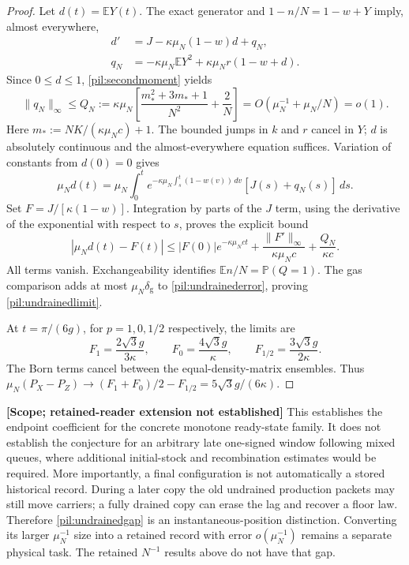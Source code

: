\documentclass[11pt,a4paper]{article}
\theoremstyle{definition}
\theoremstyle{remark}\newtheorem{remark}[theorem]{Remark}
\newcommand{\status}[1]{\textbf{[#1]}\quad}
\begin{document}
\begin{proof}
Let $d(t)=\mathbb E Y(t)$. The exact generator and $1-n/N=1-w+Y$ imply, almost everywhere,
\begin{align}\label{pil:deficitODE}
 d'&=J-\kappa\mu_N(1-w)d+q_N,\\
 q_N&=-\kappa\mu_N\mathbb E Y^2
       +\kappa\mu_N r(1-w+d).\nonumber
\end{align}
Since $0\le d\le1$, \eqref{pil:secondmoment} yields
\[
 \|q_N\|_\infty\le Q_N:=\kappa\mu_N\left[
 \frac{m_*^2+3m_*+1}{N^2}+\frac2N\right]
 =O(\mu_N^{-1}+\mu_N/N)=o(1).
\]
Here $m_*:=NK/(\kappa\mu_Nc)+1$.
The bounded jumps in $k$ and $r$ cancel in $Y$; $d$ is absolutely continuous and the almost-everywhere equation suffices. Variation of constants from $d(0)=0$ gives
\[
 \mu_Nd(t)=\mu_N\int_0^t
 e^{-\kappa\mu_N\int_s^t(1-w(v))\,dv}[J(s)+q_N(s)]\,ds.
\]
Set $F=J/[\kappa(1-w)]$. Integration by parts of the $J$ term, using the derivative of the exponential with respect to $s$, proves the explicit bound
\begin{equation}\label{pil:undrainederror}
 |\mu_Nd(t)-F(t)|\le
 |F(0)|e^{-\kappa\mu_Nct}
 +\frac{\|F'\|_\infty}{\kappa\mu_Nc}
 +\frac{Q_N}{\kappa c}.
\end{equation}
All terms vanish. Exchangeability identifies $\mathbb E n/N=\mathbb P(Q=1)$. The gas comparison adds at most $\mu_N\delta_{\mathrm g}$ to \eqref{pil:undrainederror}, proving \eqref{pil:undrainedlimit}.

At $t=\pi/(6g)$, for $p=1,0,1/2$ respectively, the limits are
\[
 F_1=\frac{2\sqrt3g}{3\kappa},\qquad
 F_0=\frac{4\sqrt3g}{\kappa},\qquad
 F_{1/2}=\frac{3\sqrt3g}{2\kappa}.
\]
The Born terms cancel between the equal-density-matrix ensembles. Thus
$\mu_N(P_X-P_Z)\to(F_1+F_0)/2-F_{1/2}=5\sqrt3g/(6\kappa)$.
\end{proof}

\status{Scope; retained-reader extension not established}
This establishes the endpoint coefficient for the concrete monotone ready-state family. It does not establish the conjecture for an arbitrary late one-signed window following mixed queues, where additional initial-stock and recombination estimates would be required. More importantly, a final configuration is not automatically a stored historical record. During a later copy the old undrained production packets may still move carriers; a fully drained copy can erase the lag and recover a floor law. Therefore \eqref{pil:undrainedgap} is an instantaneous-position distinction. Converting its larger $\mu_N^{-1}$ size into a retained record with error $o(\mu_N^{-1})$ remains a separate physical task. The retained $N^{-1}$ results above do not have that gap.
\end{document}
